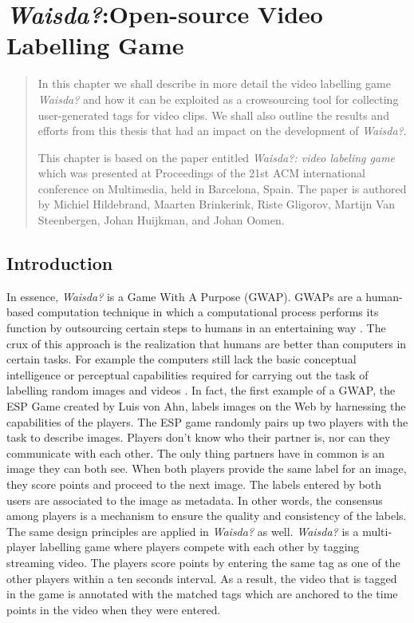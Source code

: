 \chapter{\textit{Waisda?}:Open-source Video Labelling Game}\label{chap:waisda}

\begin{quotation}
\noindent 
In this chapter we shall describe in more detail the video labelling game \textit{Waisda?} and how it can be exploited as a crowsourcing tool for collecting user-generated tags for video clips. We shall also outline the results and efforts from this thesis that had an impact on the development of \textit{Waisda?}.

This chapter is based on the paper entitled \textit{Waisda?: video labeling game} which was presented at Proceedings of the 21st ACM international conference on Multimedia, held in Barcelona, Spain. The paper is authored by Michiel Hildebrand, Maarten Brinkerink, Riste Gligorov, Martijn Van Steenbergen, Johan Huijkman, and Johan Oomen.
\end{quotation}

\section{Introduction}

In essence, \textit{Waisda?} is a Game With A Purpose (GWAP). GWAPs are a human-based computation technique in which a computational process performs its function by outsourcing certain steps to humans in an entertaining way \cite{Ahn:2006:GP:1155311.1155342,gwap}. The crux of this approach is the realization that humans are better than computers in certain tasks. For example the computers still lack the basic conceptual intelligence or perceptual capabilities required for carrying out the task of labelling random images and videos \cite{Ahn:2006:GP:1155311.1155342}. In fact, the first example of a GWAP, the ESP Game created by Luis von Ahn, labels images on the Web by harnessing the capabilities of the players. The ESP game randomly pairs up two players with the task to describe images. Players don't know who their partner is, nor can
they communicate with each other. The only thing partners have in common is an image they can both see.
When both players provide the same label for an image, they score points and proceed to the next image. The labels entered by both users are associated to the image as metadata. In other words, the consensus among players is a mechanism to ensure the quality and consistency of the labels. The same design principles are applied in \textit{Waisda?} as well. \textit{Waisda?} is a multi-player labelling game where players compete with each other by tagging streaming video. The players score points by entering the same tag as one of the other players within a ten seconds interval. As a result, the video that is tagged in the game is annotated with the matched tags which are anchored to the time points in the video when they were entered.

